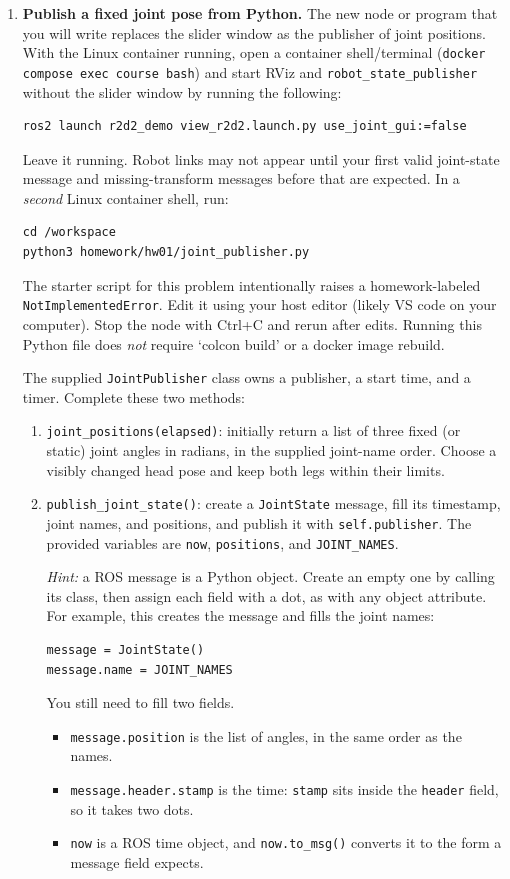 \documentclass[12pt,letterpaper]{article}
\begin{document}
\newpage
\begin{enumerate}[start=2]
\item \textbf{Publish a fixed joint pose from Python.}
The new node or program that you will write replaces the slider window as the publisher of joint positions.
With the Linux container running, open a container shell/terminal
(\texttt{docker compose exec course bash}) and start RViz and
\texttt{robot\_state\_publisher} without the slider window by running the following:
\begin{lstlisting}
ros2 launch r2d2_demo view_r2d2.launch.py use_joint_gui:=false
\end{lstlisting}
Leave it running. Robot links may not appear until your first valid
joint-state message and missing-transform messages before that are expected.
In a \emph{second} Linux container shell, run:
\begin{lstlisting}
cd /workspace
python3 homework/hw01/joint_publisher.py
\end{lstlisting}
The starter script for this problem intentionally raises a homework-labeled
\texttt{NotImplementedError}. Edit it using your host editor (likely VS code on your computer). Stop the node
with Ctrl+C and rerun after edits. Running this Python file does \emph{not}
require `colcon build' or a docker image rebuild.

The supplied \texttt{JointPublisher} class owns a publisher, a start time,
and a timer. Complete these two methods:
\begin{enumerate}
\item \texttt{joint\_positions(elapsed)}: initially return a list
of three fixed (or static) joint angles in radians, in the supplied joint-name order. Choose
a visibly changed head pose and keep both legs within their limits.
\item \texttt{publish\_joint\_state()}: create a \texttt{JointState}
message, fill its timestamp, joint names, and positions, and publish it with
\texttt{self.publisher}. The provided variables are \texttt{now},
\texttt{positions}, and \texttt{JOINT\_NAMES}.

\emph{Hint:} a ROS message is a Python object. Create an empty one by
calling its class, then assign each field with a dot, as with any object
attribute. For example, this creates the message and fills the joint names:
\begin{lstlisting}
message = JointState()
message.name = JOINT_NAMES
\end{lstlisting}
You still need to fill two fields. 
\begin{itemize}
\item \texttt{message.position} is the list of
angles, in the same order as the names.
\item \texttt{message.header.stamp} is the
time: \texttt{stamp} sits inside the \texttt{header} field, so it takes two
dots.
\item \texttt{now} is a ROS time object, and \texttt{now.to\_msg()} converts
it to the form a message field expects. 
\end{itemize}  


\end{enumerate}
\end{enumerate}
\end{document}
